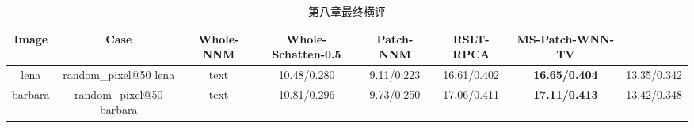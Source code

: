 \begin{table}[htbp]
\centering
\caption{第八章最终横评}
\label{tab:chapter8_final}
\small
\begin{tabular}{|c|c|c|c|c|c|c|}
\hline
Image & Case & Whole-NNM & Whole-Schatten-0.5 & Patch-NNM & RSLT-RPCA & MS-Patch-WNN-TV \\
\hline
lena & random_pixel@50%
lena & text & 10.48/0.280 & 9.11/0.223 & 16.61/0.402 & \textbf{16.65/0.404} & 13.35/0.342 \\
barbara & random_pixel@50%
barbara & text & 10.81/0.296 & 9.73/0.250 & 17.06/0.411 & \textbf{17.11/0.413} & 13.42/0.348 \\
\hline
\end{tabular}
\end{table}
